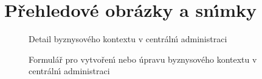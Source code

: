 
\chapter{Přehledové obrázky a sn\'{\i}mky}

\vspace{4\baselineskip}

\begin{figure}[h]
    \centering
    \caption{Detail byznysového kontextu v centráln\'{\i} administraci}
    \label{fig:screenshot-context-detail}
\end{figure}

\begin{figure}
    \centering
    \caption{Formulář pro vytvořen\'{\i} nebo úpravu byznysového kontextu v centráln\'{\i} administraci}
    \label{fig:screenshot-context-edit}
\end{figure}

